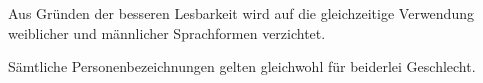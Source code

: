 Aus Gründen der besseren Lesbarkeit wird auf die gleichzeitige Verwendung weiblicher und männlicher Sprachformen verzichtet.

Sämtliche Personenbezeichnungen gelten gleichwohl für beiderlei Geschlecht.